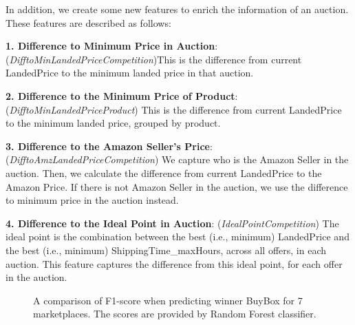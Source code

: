 In addition, we create some new features to enrich the information of an auction. These features are described as follows:

\textbf{1. Difference to Minimum Price in Auction}: (\textit{DifftoMinLandedPriceCompetition})This is the difference from current LandedPrice to the minimum landed price in that auction.

\textbf{2. Difference to the Minimum Price of Product}: (\textit{DifftoMinLandedPriceProduct}) This is the difference from current LandedPrice to the minimum landed price, grouped by product.

\textbf{3. Difference to the Amazon Seller's Price}: (\textit{DifftoAmzLandedPriceCompetition}) We capture who is the Amazon Seller in the auction. Then, we calculate the difference from current LandedPrice to the Amazon Price. If there is not Amazon Seller in the auction, we use the difference to minimum price in the auction instead.

\textbf{4. Difference to the Ideal Point in Auction}: (\textit{IdealPointCompetition}) The ideal point is the combination between the best (i.e., minimum) LandedPrice and the best (i.e., minimum) ShippingTime\_maxHours, across all offers, in each auction. This feature captures the difference from this ideal point, for each offer in the auction.
\begin{figure}[!h]
	\begin{center}
	\end{center}
	\caption{\label{fig:addfeaures}A comparison of F1-score when predicting winner BuyBox for 7 marketplaces. The scores are provided by Random Forest classifier.}
\end{figure}

